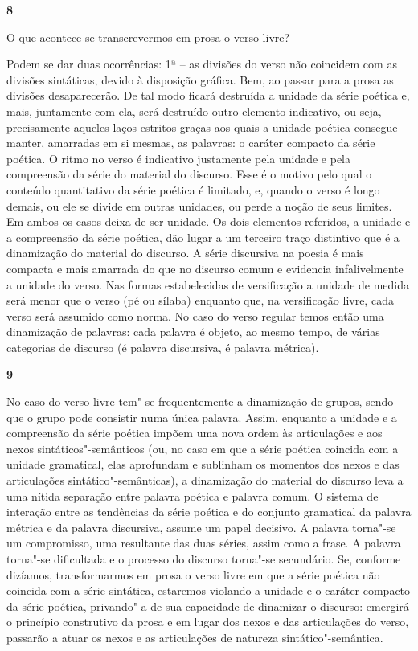 \textbf{8}

O que acontece se transcrevermos em prosa o verso livre?

Podem se dar duas ocorrências: 1ª -- as divisões do verso não coincidem
com as divisões sintáticas, devido à disposição gráfica. Bem, ao passar
para a prosa as divisões desaparecerão. De tal modo ficará destruída a
unidade da série poética e, mais, juntamente com ela, será destruído
outro elemento indicativo, ou seja, precisamente aqueles laços estritos
graças aos quais a unidade poética consegue manter, amarradas em si
mesmas, as palavras: o caráter compacto da série poética. O ritmo no
verso é indicativo justamente pela unidade e pela compreensão da série
do material do discurso. Esse é o motivo pelo qual o conteúdo
quantitativo da série poética é limitado, e, quando o verso é longo
demais, ou ele se divide em outras unidades, ou perde a noção de seus
limites. Em ambos os casos deixa de ser unidade. Os dois elementos
referidos, a unidade e a compreensão da série poética, dão lugar a um
terceiro traço distintivo que é a dinamização do material do discurso. A
série discursiva na poesia é mais compacta e mais amarrada do que no
discurso comum e evidencia infalivelmente a unidade do verso. Nas formas
estabelecidas de versificação a unidade de medida será menor que o verso
(pé ou sílaba) enquanto que, na versificação livre, cada verso será
assumido como norma. No caso do verso regular temos então uma
dinamização de palavras: cada palavra é objeto, ao mesmo tempo, de
várias categorias de discurso (é palavra discursiva, é palavra métrica).

\textbf{9}

No caso do verso livre tem"-se frequentemente a dinamização de grupos,
sendo que o grupo pode consistir numa única palavra. Assim, enquanto a
unidade e a compreensão da série poética impõem uma nova ordem às
articulações e aos nexos sintáticos"-semânticos (ou, no caso em que a
série poética coincida com a unidade gramatical, elas aprofundam e
sublinham os momentos dos nexos e das articulações sintático"-semânticas), a dinamização do material do discurso leva a uma nítida
separação entre palavra poética e palavra comum. O sistema de interação
entre as tendências da série poética e do conjunto gramatical da palavra
métrica e da palavra discursiva, assume um papel decisivo. A palavra
torna"-se um compromisso, uma resultante das duas séries, assim como a
frase. A palavra torna"-se dificultada e o processo do discurso torna"-se
secundário. Se, conforme dizíamos, transformarmos em prosa o verso livre
em que a série poética não coincida com a série sintática, estaremos
violando a unidade e o caráter compacto da série poética, privando"-a de
sua capacidade de dinamizar o discurso: emergirá o princípio construtivo
da prosa e em lugar dos nexos e das articulações do verso, passarão a
atuar os nexos e as articulações de natureza sintático"-semântica.

